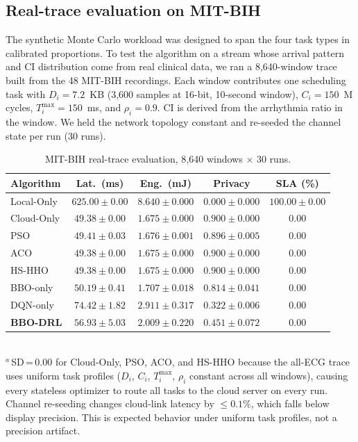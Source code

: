\documentclass[journal]{IEEEtran}
\begin{document}
\subsection{Real-trace evaluation on MIT-BIH}
\label{subsec:mitbih}

The synthetic Monte Carlo workload was designed to span the four task
types in calibrated proportions. To test the algorithm on a stream
whose arrival pattern and CI distribution come from real clinical
data, we ran a 8{,}640-window trace built from the 48 MIT-BIH
recordings. Each window contributes one scheduling task with
$D_i = 7.2$~KB (3{,}600 samples at 16-bit, 10-second window),
$C_i = 150$~M cycles, $T^{\max}_i = 150$~ms, and $\rho_i = 0.9$. CI is
derived from the arrhythmia ratio in the window. We held the network
topology constant and re-seeded the channel state per run (30 runs).

\begin{table}[t]
  \centering
  \caption{MIT-BIH real-trace evaluation, 8{,}640 windows $\times$ 30
           runs.}
  \label{tab:mitbih}
  \renewcommand{\arraystretch}{1.15}
  \begin{tabular}{lcccc}
    \toprule
    \textbf{Algorithm} &
    \textbf{Lat.\ (ms)} & \textbf{Eng.\ (mJ)} &
    \textbf{Privacy} & \textbf{SLA (\%)} \\
    \midrule
    Local-Only  & $625.00 \pm 0.00$ & $8.640 \pm 0.000$ & $0.000 \pm 0.000$ & $100.00 \pm 0.00$ \\
    Cloud-Only  & $49.38 \pm 0.00$  & $1.675 \pm 0.000$ & $0.900 \pm 0.000$ & $\mathbf{0.00}$ \\
    PSO         & $49.41 \pm 0.03$  & $1.676 \pm 0.001$ & $0.896 \pm 0.005$ & $\mathbf{0.00}$ \\
    ACO         & $49.38 \pm 0.00$  & $1.675 \pm 0.000$ & $0.900 \pm 0.000$ & $\mathbf{0.00}$ \\
    HS-HHO      & $49.38 \pm 0.00$  & $1.675 \pm 0.000$ & $0.900 \pm 0.000$ & $\mathbf{0.00}$ \\
    BBO-only    & $50.19 \pm 0.41$  & $1.707 \pm 0.018$ & $0.814 \pm 0.041$ & $\mathbf{0.00}$ \\
    DQN-only    & $74.42 \pm 1.82$  & $2.911 \pm 0.317$ & $\mathbf{0.322 \pm 0.006}$ & $\mathbf{0.00}$ \\
    \textbf{BBO-DRL} & $56.93 \pm 5.03$ & $2.009 \pm 0.220$ & $0.451 \pm 0.072$ & $\mathbf{0.00}$ \\
    \bottomrule
  \end{tabular}\\[3pt]
  {\footnotesize $^{a}$\,SD\,=\,0.00 for Cloud-Only, PSO, ACO, and HS-HHO because the
  all-ECG trace uses uniform task profiles ($D_i$, $C_i$, $T^{\max}_i$, $\rho_i$
  constant across all windows), causing every stateless optimizer to route all tasks to
  the cloud server on every run. Channel re-seeding changes cloud-link latency by
  $\leq 0.1\%$, which falls below display precision. This is expected behavior under
  uniform task profiles, not a precision artifact.}
\end{table}
\end{document}
